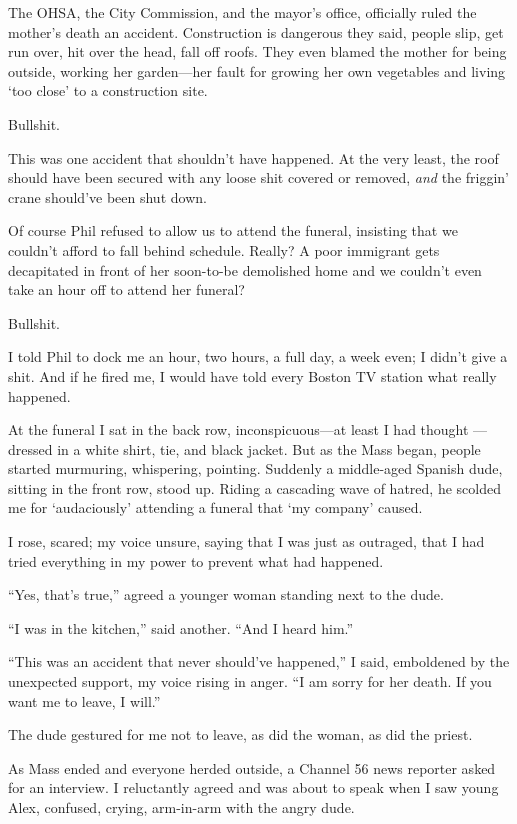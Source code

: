 The OHSA, the City Commission, and the mayor's office, officially ruled
the mother's death an accident. Construction is dangerous they said,
people slip, get run over, hit over the head, fall off roofs. They even
blamed the mother for being outside, working her garden---her fault for
growing her own vegetables and living `too close' to a construction
site.

Bullshit.

This was one accident that shouldn't have happened. At the very least,
the roof should have been secured with any loose shit covered or
removed, \emph{and} the friggin' crane should've been shut down.

Of course Phil refused to allow us to attend the funeral, insisting that
we couldn't afford to fall behind schedule. Really? A poor immigrant
gets decapitated in front of her soon-to-be demolished home and we
couldn't even take an hour off to attend her funeral?

Bullshit.

I told Phil to dock me an hour, two hours, a full day, a week even; I
didn't give a shit. And if he fired me, I would have told every Boston
TV station what really happened.

At the funeral I sat in the back row, inconspicuous---at least I had
thought ---dressed in a white shirt, tie, and black jacket. But as the
Mass began, people started murmuring, whispering, pointing. Suddenly a
middle-aged Spanish dude, sitting in the front row, stood up. Riding a
cascading wave of hatred, he scolded me for `audaciously' attending a
funeral that `my company' caused.

I rose, scared; my voice unsure, saying that I was just as outraged,
that I had tried everything in my power to prevent what had happened.

``Yes, that's true,'' agreed a younger woman standing next to the dude.

``I was in the kitchen,'' said another. ``And I heard him.''

``This was an accident that never should've happened,'' I said,
emboldened by the unexpected support, my voice rising in anger. ``I am
sorry for her death. If you want me to leave, I will.''

The dude gestured for me not to leave, as did the woman, as did the
priest.

As Mass ended and everyone herded outside, a Channel 56 news reporter
asked for an interview. I reluctantly agreed and was about to speak when
I saw young Alex, confused, crying, arm-in-arm with the angry dude.

